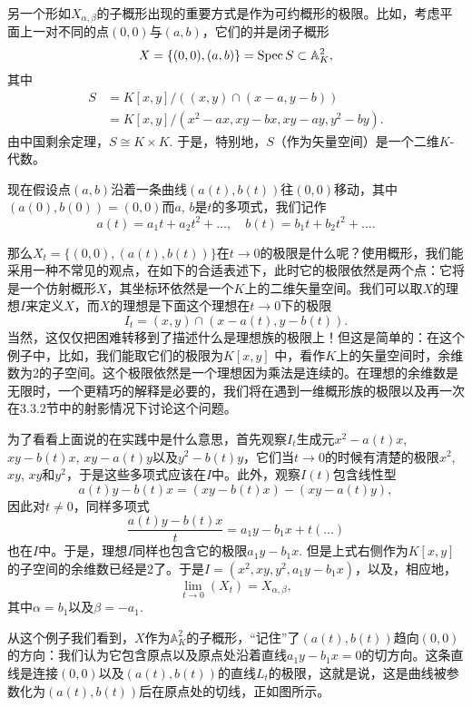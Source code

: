 另一个形如$X_{\alpha,\beta}$的子概形出现的重要方式是作为可约概形的极限。比如，考虑平面上一对不同的点$(0,0)$与$(a,b)$，它们的并是闭子概形
\[
	X=\{(0,0),(a,b)\}=\operatorname{Spec} S\subset \mathbb{A}_K^2,
\]
其中
\[
\begin{aligned}
	S&=K[x,y]/\left((x,y)\cap (x-a,y-b)\right)\\
	&=K[x,y]/(x^2-ax,xy-bx,xy-ay,y^2-by).
\end{aligned}
\]
由中国剩余定理，$S\cong K\times K$. 于是，特别地，$S$（作为矢量空间）是一个二维$K$-代数。

现在假设点$(a,b)$沿着一条曲线$(a(t),b(t))$往$(0,0)$移动，其中$(a(0),b(0))=(0,0)$而$a$, $b$是$t$的多项式，我们记作
\[
	a(t)=a_1t+a_2t^2+\dots,\quad b(t)=b_1t+b_2t^2+\dots.
\]


那么$X_t=\{(0,0),(a(t),b(t))\}$在$t\to 0$的极限是什么呢？使用概形，我们能采用一种不常见的观点，在如下的合适表述下，此时它的极限依然是两个点：它将是一个仿射概形$X$，其坐标环依然是一个$K$上的二维矢量空间。我们可以取$X$的理想$I$来定义$X$，而$X$的理想是下面这个理想在$t\to 0$下的极限
\[
	I_t=(x,y)\cap (x-a(t),y-b(t)).
\]
当然，这仅仅把困难转移到了描述什么是理想族的极限上！但这是简单的：在这个例子中，比如，我们能取它们的极限为$K[x,y]$
中，看作$K$上的矢量空间时，余维数为2的子空间。这个极限依然是一个理想因为乘法是连续的。在理想的余维数是无限时，一个更精巧的解释是必要的，我们将在遇到一维概形族的极限以及再一次在3.3.2节中的射影情况下讨论这个问题。

为了看看上面说的在实践中是什么意思，首先观察$I_t$生成元$x^2-a(t)x$, $xy-b(t)x$, $xy-a(t)y$以及$y^2-b(t)y$，它们当$t\to 0$的时候有清楚的极限$x^2$, $xy$, $xy$和$y^2$，于是这些多项式应该在$I$中。此外，观察$I(t)$包含线性型
\[
	a(t)y-b(t)x=(xy-b(t)x)-(xy-a(t)y),
\]
因此对$t\neq 0$，同样多项式
\[
	\frac{a(t)y-b(t)x}{t}=a_1y-b_1x+t(\dots)
\]
也在$I$中。于是，理想$I$同样也包含它的极限$a_1y-b_1x$. 但是上式右侧作为$K[x,y]$的子空间的余维数已经是2了。于是$I=(x^2,xy,y^2,a_1y-b_1x)$，以及，相应地，
\[
	\lim_{t\to 0}(X_t)=X_{\alpha,\beta},
\]
其中$\alpha=b_1$以及$\beta=-a_1$.

从这个例子我们看到，$X$作为$\mathbb{A}_K^2$的子概形，“记住”了$(a(t),b(t))$趋向$(0,0)$的方向：我们认为它包含原点以及原点处沿着直线$a_1y-b_1x=0$的切方向。这条直线是连接$(0,0)$以及$(a(t),b(t))$的直线$L_t$的极限，这就是说，这是曲线被参数化为$(a(t),b(t))$后在原点处的切线，正如图所示。

